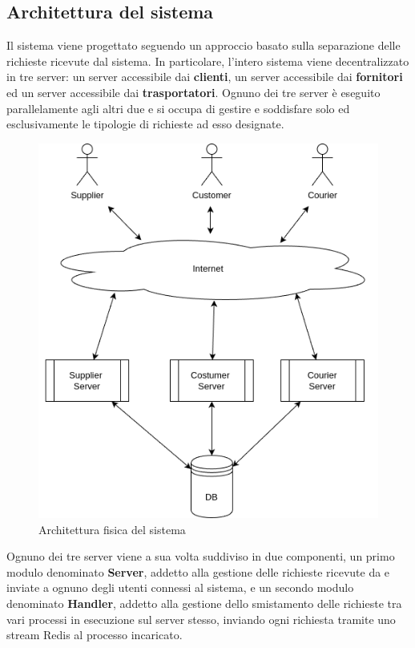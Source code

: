 \documentclass[12pt]{report}
\begin{document}
    \newpage
    
    \subsection{Architettura del sistema}
    
    Il sistema viene progettato seguendo un approccio basato sulla separazione delle richieste ricevute dal sistema. In particolare, l'intero sistema viene decentralizzato in tre server: un server accessibile dai \textbf{clienti}, un server accessibile dai \textbf{fornitori} ed un server accessibile dai \textbf{trasportatori}. Ognuno dei tre server è eseguito parallelamente agli altri due e si occupa di gestire e soddisfare solo ed esclusivamente le tipologie di richieste ad esso designate.

    \begin{figure}[H]
        \centering
        \includegraphics[scale=0.5]{images/System Architecture.png}
        \caption{Architettura fisica del sistema}
        \label{fig:physical_architecture}
    \end{figure}
    
    Ognuno dei tre server viene a sua volta suddiviso in due componenti, un primo modulo denominato \textbf{Server}, addetto alla gestione delle richieste ricevute da e inviate a ognuno degli utenti connessi al sistema, e un secondo modulo denominato \textbf{Handler}, addetto alla gestione dello smistamento delle richieste tra vari processi in esecuzione sul server stesso, inviando ogni richiesta tramite uno stream Redis al processo incaricato. 
\end{document}
